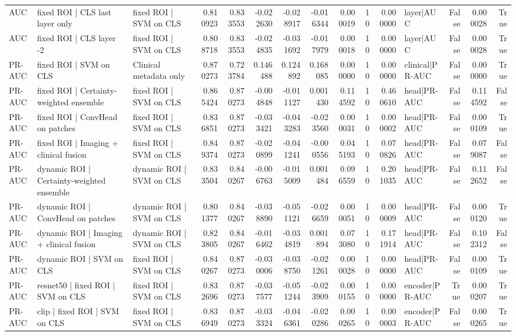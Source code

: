 \begin{table}
\begin{tabular}{lllrrrrrrrrlrrr}
AUC & fixed ROI | CLS last layer only & fixed ROI | SVM on CLS & 0.810923 & 0.833553 & -0.022630 & -0.028917 & -0.016344 & 0.000019 & 10 & 0.000000 & layer|AUC & False & 0.000028 & True \\
AUC & fixed ROI | CLS layer -2 & fixed ROI | SVM on CLS & 0.808718 & 0.833553 & -0.024835 & -0.031692 & -0.017979 & 0.000018 & 10 & 0.000000 & layer|AUC & False & 0.000028 & True \\
PR-AUC & fixed ROI | SVM on CLS & Clinical metadata only & 0.870273 & 0.723784 & 0.146488 & 0.124892 & 0.168085 & 0.000000 & 10 & 0.000000 & clinical|PR-AUC & False & 0.000000 & True \\
PR-AUC & fixed ROI | Certainty-weighted ensemble & fixed ROI | SVM on CLS & 0.865424 & 0.870273 & -0.004848 & -0.011127 & 0.001430 & 0.114592 & 10 & 0.460610 & head|PR-AUC & False & 0.114592 & False \\
PR-AUC & fixed ROI | ConvHead on patches & fixed ROI | SVM on CLS & 0.836851 & 0.870273 & -0.033421 & -0.043283 & -0.023560 & 0.000031 & 10 & 0.000002 & head|PR-AUC & False & 0.000109 & True \\
PR-AUC & fixed ROI | Imaging + clinical fusion & fixed ROI | SVM on CLS & 0.849374 & 0.870273 & -0.020899 & -0.041241 & -0.000556 & 0.045193 & 10 & 0.070826 & head|PR-AUC & False & 0.079087 & False \\
PR-AUC & dynamic ROI | Certainty-weighted ensemble & dynamic ROI | SVM on CLS & 0.833504 & 0.840267 & -0.006763 & -0.015009 & 0.001484 & 0.096559 & 10 & 0.201035 & head|PR-AUC & False & 0.112652 & False \\
PR-AUC & dynamic ROI | ConvHead on patches & dynamic ROI | SVM on CLS & 0.801377 & 0.840267 & -0.038890 & -0.051121 & -0.026659 & 0.000051 & 10 & 0.000009 & head|PR-AUC & False & 0.000120 & True \\
PR-AUC & dynamic ROI | Imaging + clinical fusion & dynamic ROI | SVM on CLS & 0.823805 & 0.840267 & -0.016462 & -0.034819 & 0.001894 & 0.073080 & 10 & 0.171914 & head|PR-AUC & False & 0.102312 & False \\
PR-AUC & dynamic ROI | SVM on CLS & fixed ROI | SVM on CLS & 0.840267 & 0.870273 & -0.030006 & -0.038750 & -0.021261 & 0.000028 & 10 & 0.000000 & head|PR-AUC & False & 0.000109 & True \\
PR-AUC & resnet50 | fixed ROI | SVM on CLS & fixed ROI | SVM on CLS & 0.832696 & 0.870273 & -0.037577 & -0.051244 & -0.023909 & 0.000155 & 10 & 0.000000 & encoder|PR-AUC & True & 0.000207 & True \\
PR-AUC & clip | fixed ROI | SVM on CLS & fixed ROI | SVM on CLS & 0.836949 & 0.870273 & -0.033324 & -0.046361 & -0.020286 & 0.000265 & 10 & 0.000003 & encoder|PR-AUC & False & 0.000265 & True \\

\end{tabular}
\end{table}
